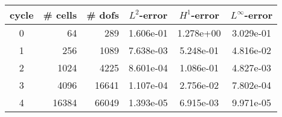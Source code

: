 \documentclass[10pt]{report}
\begin{document}
\begin{table}[H]
\begin{center}
\begin{tabular}{|c|r|r|c|c|c|} \hline
cycle & \# cells & \# dofs & $L^2$-error & $H^1$-error & $L^\infty$-error\\ \hline
0 & 64 & 289 & 1.606e-01 & 1.278e+00 & 3.029e-01\\ \hline
1 & 256 & 1089 & 7.638e-03 & 5.248e-01 & 4.816e-02\\ \hline
2 & 1024 & 4225 & 8.601e-04 & 1.086e-01 & 4.827e-03\\ \hline
3 & 4096 & 16641 & 1.107e-04 & 2.756e-02 & 7.802e-04\\ \hline
4 & 16384 & 66049 & 1.393e-05 & 6.915e-03 & 9.971e-05\\ \hline
\end{tabular}
\end{center}
\end{table}
\end{document}
